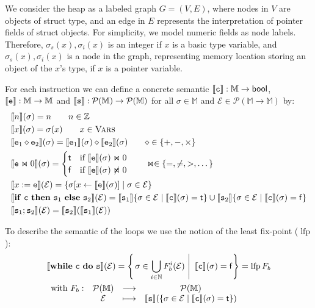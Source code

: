 \documentclass[runningheads]{llncs}
\newcommand\srule{\mathtt{s}}
\newcommand{\erule}{\mathtt{e}}
\newcommand{\crule}{\mathtt{c}}
\newcommand{\ifinst}{\mathbf{if}}
\newcommand{\theninst}{\mathbf{then}}
\newcommand{\elseinst}{\mathbf{else}}
\newcommand{\whileinst}{\mathbf{while}}
\newcommand{\doinst}{\mathbf{do}}
\newcommand{\bool}{\mathsf{bool}}
\newcommand{\True}{\mathsf{t}}
\newcommand{\False}{\mathsf{f}}
\newcommand{\Integer}{\mathbb Z}
\newcommand{\Memory}{\mathbb{M}}
\DeclareMathOperator{\lfp}{lfp}
\begin{document}
We consider the heap as a labeled graph $G=(V,E)$, where nodes in $V$ are objects of struct type, and an edge in $E$  represents the interpretation of pointer fields of struct objects. For simplicity, we model numeric fields as node labels. 
Therefore, 
$\sigma_s(x), \sigma_i(x) $ is an integer if $x$ is a basic type variable, and 
$\sigma_s(x), \sigma_i(x)$ is a node in the graph, representing memory location storing an object of the $x$'s type,  if $x$ is a pointer variable.  

For each instruction we can define a concrete semantic $\exec{\crule} : \Memory \rightarrow \bool$, $\exec{\erule} : \Memory \rightarrow \Memory$ and $\exec{\srule} : \mathcal{P}(\Memory) \rightarrow \mathcal{P}(\Memory)$ for all $\sigma\in \Memory$ and $\mathcal E \in \mathcal{P}(\Memory \rightarrow \Memory)$ by:
\begin{align*}
	& \exec{n}(\sigma) = n \qquad n \in\Integer \\
	& \exec{x}(\sigma) = \sigma(x) \qquad x\in \vars\\
	& \exec{\erule_1 \diamond \erule_2}(\sigma) = \exec{\erule_1}(\sigma) \diamond \exec{\erule_2}(\sigma) \qquad \diamond \in \{+, -, \times\} \\
	& \exec{\erule \Join 0}(\sigma) = \begin{cases}
		\True & \text {if } \exec{\erule}(\sigma) \Join 0 \\
		\False & \text{if } \exec{\erule}(\sigma) \not\Join 0 
	\end{cases} \qquad \Join\in\{=, \neq, >, \dots\} \\
	& \exec{x := \erule}(\mathcal E) = \{\sigma[x \leftarrow \exec{\erule}(\sigma)] \mid \sigma\in\mathcal{E}\}\\
	& \exec{\ifinst\ \crule\ \theninst \ {\srule_1} \ \elseinst \ {\srule_2}}(\mathcal E) = \exec{\srule_1}\{\sigma \in \mathcal{E} \mid \exec{\crule}(\sigma) = \True\} \cup \exec{\srule_2}\{\sigma \in \mathcal{E} \mid \exec{\crule}(\sigma) = \False\} \\
	& \exec{\srule_1 ; \srule_2}(\mathcal E) = \exec{\srule_2}(\exec{\srule_1}(\mathcal E))
\end{align*}

To describe the semantic of the loops we use the notion of the least fix-point ($\lfp$):
	\begin{align*}
	&\exec{\whileinst \ \crule \ \doinst \ {\srule}}(\mathcal E) = \left\{ \left. \sigma \in \bigcup_{i \in \mathbb N} F_b^i(\mathcal{E}) \ \right| \ \exec{\crule}(\sigma) = \False\right\} = \lfp F_b\\
	&\begin{array}{cccc}
    \text{with } F_b: & \mathcal{P}(\Memory) & \longrightarrow & \mathcal{P}(\Memory)  \\ 
     & \mathcal E & \longmapsto & \exec{\srule} (\{ \sigma \in \mathcal{E} \mid  \exec{\crule}(\sigma) = \True \} )
    \end{array} 
\end{align*}
\end{document}
